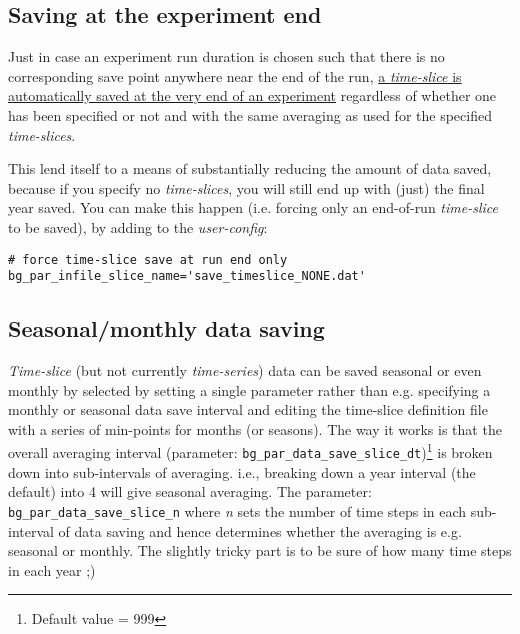 \documentclass[11pt,fleqn]{book} %
\begin{document}

\subsection{Saving at the experiment end}

Just in case an experiment run duration is chosen such that there is no corresponding save point anywhere near the end of the run, \uline{a \textit{time-slice} is automatically saved at the very end of an experiment} regardless of whether one has been specified or not and with the same averaging as used for the specified \textit{time-slices}.

This lend itself to a means of substantially reducing the amount of data saved, because if you specify no \textit{time-slices}, you will still end up with (just) the final year saved. You can make this happen (i.e. forcing only an end-of-run \textit{time-slice} to be saved), by adding to the \textit{user-config}:
\small\begin{verbatim}
# force time-slice save at run end only
bg_par_infile_slice_name='save_timeslice_NONE.dat'
\end{verbatim}\normalsize

%
\subsection{Seasonal/monthly data saving}

\textit{Time-slice} (but not currently \textit{time-series}) data can be saved seasonal or even monthly by selected by setting a single parameter rather than e.g. specifying a monthly or seasonal data save interval and editing the time-slice definition file with a series of min-points for months (or seasons).
The way it works is that the overall averaging interval (parameter: \texttt{bg\_par\_data\_save\_slice\_dt})\footnote{Default value = 999} is broken down into sub-intervals of averaging. i.e., breaking down a year interval (the default) into 4 will give seasonal averaging. The parameter: \texttt{bg\_par\_data\_save\_slice\_n} where \textit{n} sets the number of time steps in each sub-interval of data saving and hence determines whether the averaging is e.g. seasonal or monthly. The slightly tricky part is to be sure of how many time steps in each year ;)
\end{document}

